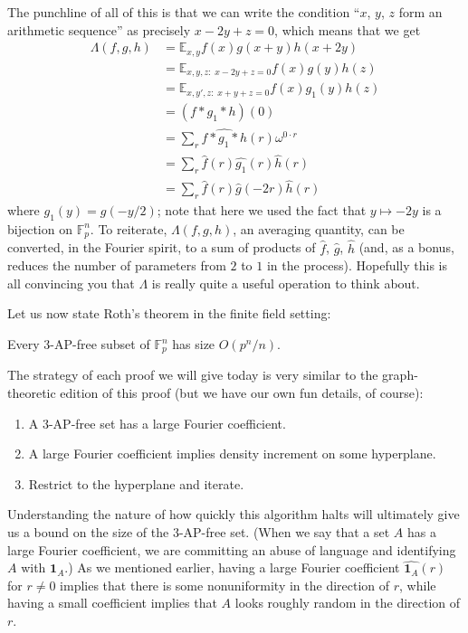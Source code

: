 \documentclass[10pt]{scrartcl}
\providecommand{\EE}{\mathbb E}
\providecommand{\FF}{\mathbb F}
\providecommand{\ind}[1]{\mathbf 1_{#1}}
\providecommand{\ii}{\item}
\renewcommand{\hat}{\widehat}
\begin{document}
The punchline of all of this is that we can write the condition
``$x$, $y$, $z$ form an arithmetic sequence'' as precisely $x-2y+z=0$,
which means that we get
\begin{align*}
	\Lambda(f,g,h) &=\EE_{x,y}f(x)g(x+y)h(x+2y)\\
	&= \EE_{x,y,z:\;x-2y+z=0} f(x)g(y)h(z)\\
	&= \EE_{x,y',z:\; x+y+z=0} f(x)g_1(y)h(z)\\
	&= (f*g_1*h)(0)\\
	&= \sum_r \hat{f*g_1*h}(r)\omega^{0\cdot r}\\
	&= \sum_r \hat f(r)\hat{g_1}(r)\hat h(r)\\
	&= \sum_r \hat f(r)\hat g(-2r)\hat h(r)
\end{align*}
where $g_1(y) = g(-y/2)$; note that here we used the fact that
$y\mapsto -2y$ is a bijection on $\FF_p^n$.
To reiterate, $\Lambda(f,g,h)$, an averaging quantity,
can be converted, in the Fourier spirit, to a sum of products of
$\hat f$, $\hat g$, $\hat h$ (and, as a bonus, reduces the number of
parameters from $2$ to $1$ in the process).
Hopefully this is all convincing you that $\Lambda$ is really quite
a useful operation to think about.

Let us now state Roth's theorem in the finite field setting:
\begin{theorem}
	Every 3-AP-free subset of $\FF_p^n$ has size $O(p^n/n)$.
\end{theorem}

The strategy of each proof we will give today is very similar to the
graph-theoretic edition of this proof
(but we have our own fun details, of course):
\begin{enumerate}[(1)]
	\ii A 3-AP-free set has a large Fourier coefficient.
	\ii A large Fourier coefficient implies density increment
	on some hyperplane.
	\ii Restrict to the hyperplane and iterate.
\end{enumerate}

Understanding the nature of how quickly this algorithm halts
will ultimately give us a bound on the size of the 3-AP-free set.
(When we say that a set $A$ has a large Fourier coefficient,
we are committing an abuse of language and identifying $A$ with $\ind A$.)
As we mentioned earlier, having a large Fourier coefficient
$\hat{\ind{A}}(r)$ for $r\ne 0$ implies that there is some nonuniformity
in the direction of $r$, while having a small coefficient implies that
$A$ looks roughly random in the direction of $r$.
\end{document}
